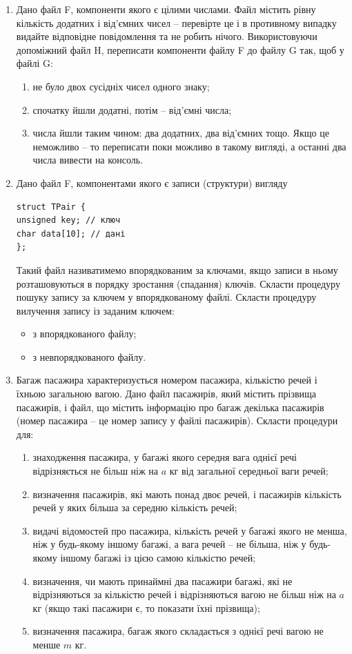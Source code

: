 \documentclass[a5paper,titlepage,openany,twoside,
]
{book_unv}%
\makeatletter
\newcommand{\xslalph}[1]{\expandafter\@xslalph\csname c@#1\endcsname}
\newcommand{\@xslalph}[1]{%
    \ifcase#1\or а\or б\or в\or г\or д\or e\or є\or ж\or з\or i%
    \or й\or к\or л\or м\or н\or о\or п\or р\or с\or т%
    \or у\or ф\or х\or ц\or ч\or ш\or ю\or я\or аа\or бб\or вв%
    \else\@ctrerr\fi%
}
\makeatother
\begin{document}
\begin{enumerate}
\begin{enumerate}
\item
  Дано файл F, компоненти якого є цілими числами. Файл містить рівну
кількість додатних і від'ємних чисел -- перевірте це і в противному
  випадку видайте відповідне повідомлення та не робить нічого.
  Використовуючи допоміжний файл H, переписати компоненти файлу F до
  файлу G так, щоб у файлі G:
\begin{enumerate}[label=\xslalph*)]
\item
не було двох сусідніх чисел одного знаку;
\item
спочатку йшли додатні, потім -- від'ємні числа;
\item
числа йшли таким чином: два додатних, два від'ємних тощо. Якщо це
неможливо -- то переписати поки можливо в такому вигляді, а останні два
числа вивести на консоль.
\end{enumerate}

\item
  Дано файл F, компонентами якого є записи (структури) вигляду
\begin{verbatim}
struct TPair {
unsigned key; // ключ
char data[10]; // дані
};
\end{verbatim}

Такий файл називатимемо впорядкованим за ключами, якщо записи в ньому
розташовуються в порядку зростання (спадання) ключів. Скласти процедуру
пошуку запису за ключем у впорядкованому файлі. Скласти процедуру
вилучення запису із заданим ключем:
\begin{itemize}
\item з впорядкованого файлу;
\item з невпорядкованого файлу.
\end{itemize}

\item
  Багаж пасажира характеризується номером пасажира, кількістю речей і
  їхньою загальною вагою. Дано файл пасажирів, який містить прізвища
  пасажирів, і файл, що містить інформацію про багаж декілька пасажирів
  (номер пасажира -- це номер запису у файлі пасажирів). 
Скласти процедури для:
  \begin{enumerate}[label=\xslalph*)]
\item
знаходження пасажира, у багажі якого середня вага однієї речі
відрізняється не більш ніж на $a$ кг від загальної середньої ваги речей;
\item
визначення пасажирів, які мають понад двоє речей, і пасажирів
кількість речей у яких більша за середню кількість речей;
\item
видачі відомостей про пасажира, кількість речей у багажі якого не
менша, ніж у будь-якому іншому багажі, а вага речей -- не більша, ніж у
будь-якому іншому багажі із цією самою кількістю речей;
\item
визначення, чи мають принаймні два пасажири багажі, які не
відрізняються за кількістю речей і відрізняються вагою не більш ніж на $a$
кг (якщо такі пасажири є, то показати їхні прізвища);
\item визначення пасажира, багаж якого складається з однієї речі вагою не
менше $m$ кг.
  \end{enumerate}


\end{enumerate}
\end{enumerate}
\end{document}
